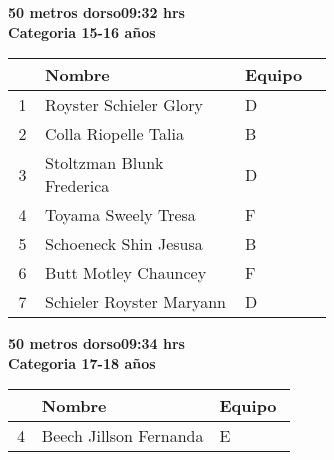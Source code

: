 \begin{minipage}{0.95\linewidth}\vspace{0.5cm} 
\begin{flushleft}
\textbf{
\hspace{-0.15cm}50 metros dorso\hspace{1.5cm}09:32 hrs \\Categoria 15-16 años}\vspace{-0.2cm} 
\end{flushleft}
\begin{tabular}{cp{0.63\linewidth}l}
\hline
& \textbf{Nombre} & \textbf{Equipo} \\ \hline
1 & Royster Schieler Glory & D \\ 
2 & Colla Riopelle Talia & B \\ 
3 & Stoltzman Blunk Frederica & D \\ 
4 & Toyama Sweely Tresa & F \\ 
5 & Schoeneck Shin Jesusa & B \\ 
6 & Butt Motley Chauncey & F \\ 
7 & Schieler Royster Maryann & D \\ 
\end{tabular}
\end{minipage}
\begin{minipage}{0.95\linewidth}\vspace{0.5cm} 
\begin{flushleft}
\textbf{
\hspace{-0.15cm}50 metros dorso\hspace{1.5cm}09:34 hrs \\Categoria 17-18 años}\vspace{-0.2cm} 
\end{flushleft}
\begin{tabular}{cp{0.63\linewidth}l}
\hline
& \textbf{Nombre} & \textbf{Equipo} \\ \hline
4 & Beech Jillson Fernanda & E \\ 
\end{tabular}
\end{minipage}
